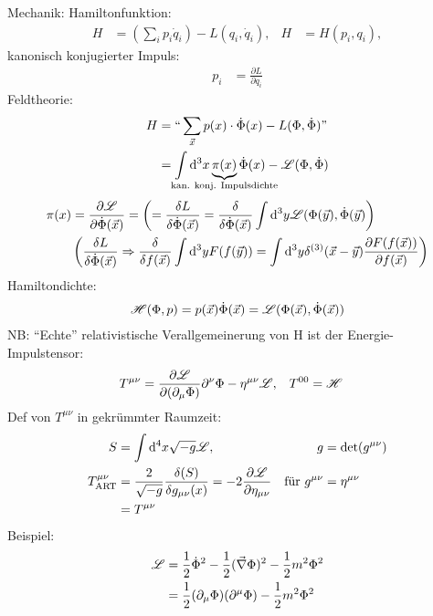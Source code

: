 	Mechanik: Hamiltonfunktion:
		\begin{align*}
			H &= (\sum_i p_i \dot{q}_i) - L (q_i, \dot{q}_i),& H&= H(p_i, q_i),
		\end{align*}
	kanonisch konjugierter Impuls:
		\begin{align*}
			p_i &= \frac{\partial L}{\partial q_i} 
		\end{align*}
	Feldtheorie:
		\begin{align*}
			H &= ``\sum_{\vec{x}} p(x) \cdot \dot{\Phi}(x) - L (\Phi, \dot{\Phi})\text{''} \\
			&= \int \diff^3 x \underbrace{\pi (x)}_{\mathclap{\text{kan. konj. Impulsdichte}}} \dot{\Phi}(x) - \La(\Phi, \dot{\Phi}) 
		\end{align*}
		\begin{align*}
			\pi(x) &= \frac{\partial \mathscr{L}}{\partial \dot{\Phi}(\vec{x})} = 
			\left(
				= \frac{\delta L}{\delta \dot{\Phi}(\vec{x})} = 
				\frac{\delta}{\delta \dot{\Phi}(\vec{x})}
				\int \mathrm{d}^3y \mathscr{L} (\Phi (\vec{y}), \dot{\Phi}(\vec{y})
			\right) \\
			&\left(
				\frac{\delta L}{\delta \dot{\Phi}(\vec{x})} \Rightarrow \frac{\delta}{\delta f(\vec{x})} \int \mathrm{d}^3y F(f(\vec{y})) = \int \mathrm{d}^3 y \delta^{(3)}(\vec{x}-\vec{y}) \frac{\partial F(f(\vec{x}))}{\partial f(\vec{x})}
			\right)
		\end{align*}
	Hamiltondichte:	
		\begin{align*}
			\mathscr{H} (\Phi, p) = p (\vec{x}) \dot{\Phi} (\vec{x}) = 
			\mathscr{L} (\Phi(\vec{x}), \dot{\Phi} (\vec{x}))
		\end{align*}
	NB: ``Echte'' relativistische Verallgemeinerung von H ist der Energie-Impulstensor:
		\begin{align*}
			T^{\mu \nu} &= \frac{\partial \mathscr{L}}{\partial(\partial_\mu \Phi)} \partial^{\nu} \Phi - \eta^{\mu \nu} \mathscr{L} ,& T^{00} &= \mathscr{H}
		\end{align*}
	Def von $T^{\mu \nu}$ in gekrümmter Raumzeit:
		\begin{align*}
			S &= \int \mathrm{d}^4 x \sqrt{-g} \mathscr{L}, & g&= \det (g^{\mu \nu}) \\
			T_{\text{ART}}^{\mu \nu} &= \frac{2}{\sqrt{-g}} \frac{\delta (S)}{\delta g_{\mu \nu}(x)} = -2 \frac{\partial \mathscr{L}}{\partial \eta_{\mu \nu}} &
			\text{für } g^{\mu \nu} &= \eta^{\mu \nu} \\
			&= T^{\mu \nu}
		\end{align*}
	Beispiel: 
		\begin{align*}
			\mathscr{L} &= \frac{1}{2} \dot{\Phi}^2 - \frac{1}{2} (\vec{\nabla} \Phi)^2 - \frac{1}{2} m^2 \Phi^2 \\
			&= \frac{1}{2} (\partial_\mu \Phi) (\partial^\mu \Phi) - \frac{1}{2}m^2 \Phi^2 
		\end{align*}
